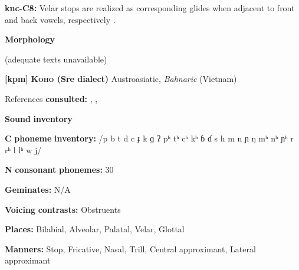 \begin{styleBody}
\textbf{knc-C8:} Velar stops are realized as corresponding glides when adjacent to front and back vowels, respectively \citep[22]{Cyffer1998}.
\end{styleBody}

\begin{styleBody}
\textbf{Morphology}
\end{styleBody}

\begin{styleBody}
(adequate texts unavailable)
\end{styleBody}

\begin{styleBody}
\textbf{[kpm]}   \textbf{\textsc{Koho} \textbf{(Sre} \textbf{dialect)}}  Austroasiatic, \textit{Bahnaric} (Vietnam)
\end{styleBody}

\begin{styleBody}
References \textbf{consulted:} \citet{LadefogedMaddieson1997}, \citet{Manley1972}, \citet{Olsen2014}
\end{styleBody}

\begin{styleBody}
\textbf{Sound} \textbf{inventory}
\end{styleBody}

\begin{styleBody}
\textbf{C} \textbf{phoneme} \textbf{inventory:} /p b t d c ɟ k ɡ ʔ pʰ tʰ cʰ kʰ ɓ ɗ s h m n ɲ ŋ mʰ nʰ ɲʰ r rʰ l lʰ w j/
\end{styleBody}

\begin{styleBody}
\textbf{N} \textbf{consonant} \textbf{phonemes:} 30
\end{styleBody}

\begin{styleBody}
\textbf{Geminates:} N/A
\end{styleBody}

\begin{styleBody}
\textbf{Voicing} \textbf{contrasts:} Obstruents
\end{styleBody}

\begin{styleBody}
\textbf{Places:} Bilabial, Alveolar, Palatal, Velar, Glottal
\end{styleBody}

\begin{styleBody}
\textbf{Manners:} Stop, Fricative, Nasal, Trill, Central approximant, Lateral approximant
\end{styleBody}

